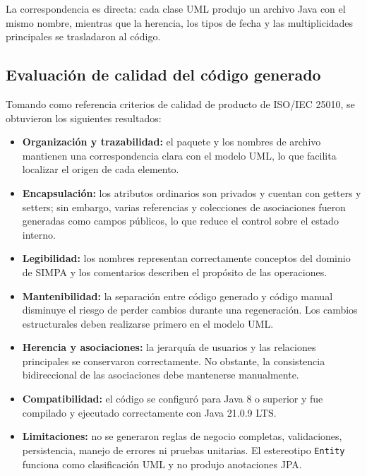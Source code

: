 \documentclass[11pt,a4paper]{article}
\begin{document}
La correspondencia es directa: cada clase UML produjo un archivo Java con el mismo nombre, mientras que la herencia, los tipos de fecha y las multiplicidades principales se trasladaron al código.


\subsection{Evaluación de calidad del código generado}

Tomando como referencia criterios de calidad de producto de ISO/IEC 25010, se obtuvieron los siguientes resultados:

\begin{itemize}
    \item \textbf{Organización y trazabilidad:} el paquete y los nombres de archivo mantienen una correspondencia clara con el modelo UML, lo que facilita localizar el origen de cada elemento.

    \item \textbf{Encapsulación:} los atributos ordinarios son privados y cuentan con getters y setters; sin embargo, varias referencias y colecciones de asociaciones fueron generadas como campos públicos, lo que reduce el control sobre el estado interno.

    \item \textbf{Legibilidad:} los nombres representan correctamente conceptos del dominio de SIMPA y los comentarios describen el propósito de las operaciones.

    \item \textbf{Mantenibilidad:} la separación entre código generado y código manual disminuye el riesgo de perder cambios durante una regeneración. Los cambios estructurales deben realizarse primero en el modelo UML.

    \item \textbf{Herencia y asociaciones:} la jerarquía de usuarios y las relaciones principales se conservaron correctamente. No obstante, la consistencia bidireccional de las asociaciones debe mantenerse manualmente.

    \item \textbf{Compatibilidad:} el código se configuró para Java 8 o superior y fue compilado y ejecutado correctamente con Java 21.0.9 LTS.

    \item \textbf{Limitaciones:} no se generaron reglas de negocio completas, validaciones, persistencia, manejo de errores ni pruebas unitarias. El estereotipo \texttt{Entity} funciona como clasificación UML y no produjo anotaciones JPA.
\end{itemize}
\end{document}
